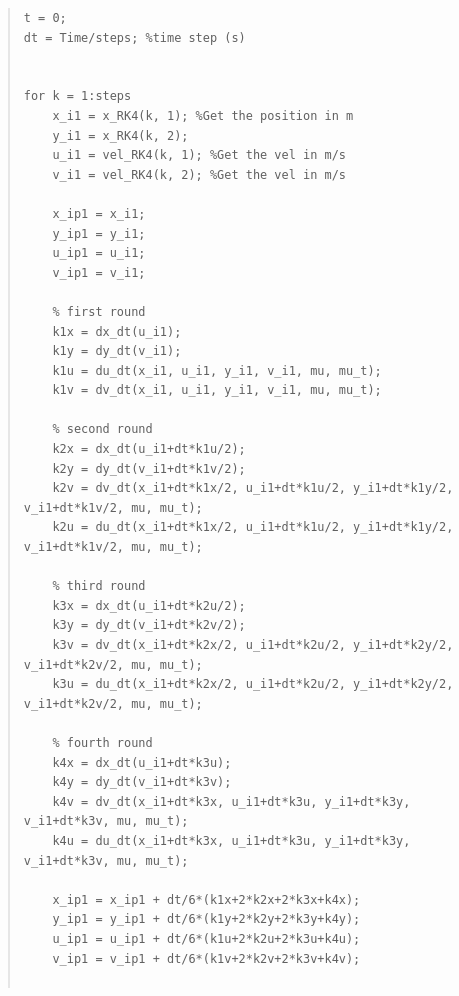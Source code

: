 \documentclass[conf]{new-aiaa}
\begin{document}
\begin{quote}
\begin{lstlisting}
t = 0;
dt = Time/steps; %time step (s)


for k = 1:steps
    x_i1 = x_RK4(k, 1); %Get the position in m
    y_i1 = x_RK4(k, 2);
    u_i1 = vel_RK4(k, 1); %Get the vel in m/s
    v_i1 = vel_RK4(k, 2); %Get the vel in m/s

    x_ip1 = x_i1;
    y_ip1 = y_i1;
    u_ip1 = u_i1;
    v_ip1 = v_i1;

    % first round
    k1x = dx_dt(u_i1);
    k1y = dy_dt(v_i1);
    k1u = du_dt(x_i1, u_i1, y_i1, v_i1, mu, mu_t);
    k1v = dv_dt(x_i1, u_i1, y_i1, v_i1, mu, mu_t);

    % second round
    k2x = dx_dt(u_i1+dt*k1u/2);
    k2y = dy_dt(v_i1+dt*k1v/2);
    k2v = dv_dt(x_i1+dt*k1x/2, u_i1+dt*k1u/2, y_i1+dt*k1y/2, v_i1+dt*k1v/2, mu, mu_t);
    k2u = du_dt(x_i1+dt*k1x/2, u_i1+dt*k1u/2, y_i1+dt*k1y/2, v_i1+dt*k1v/2, mu, mu_t);

    % third round
    k3x = dx_dt(u_i1+dt*k2u/2);
    k3y = dy_dt(v_i1+dt*k2v/2);
    k3v = dv_dt(x_i1+dt*k2x/2, u_i1+dt*k2u/2, y_i1+dt*k2y/2, v_i1+dt*k2v/2, mu, mu_t);
    k3u = du_dt(x_i1+dt*k2x/2, u_i1+dt*k2u/2, y_i1+dt*k2y/2, v_i1+dt*k2v/2, mu, mu_t);

    % fourth round
    k4x = dx_dt(u_i1+dt*k3u);
    k4y = dy_dt(v_i1+dt*k3v);
    k4v = dv_dt(x_i1+dt*k3x, u_i1+dt*k3u, y_i1+dt*k3y, v_i1+dt*k3v, mu, mu_t);
    k4u = du_dt(x_i1+dt*k3x, u_i1+dt*k3u, y_i1+dt*k3y, v_i1+dt*k3v, mu, mu_t);

    x_ip1 = x_ip1 + dt/6*(k1x+2*k2x+2*k3x+k4x);
    y_ip1 = y_ip1 + dt/6*(k1y+2*k2y+2*k3y+k4y);
    u_ip1 = u_ip1 + dt/6*(k1u+2*k2u+2*k3u+k4u);
    v_ip1 = v_ip1 + dt/6*(k1v+2*k2v+2*k3v+k4v);


\end{lstlisting}
\end{quote}
\end{document}
